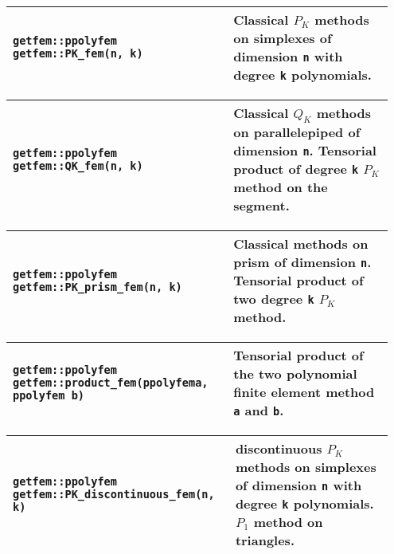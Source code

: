 \begin{center} \begin{tabular}{|m{0.55\linewidth}|m{0.4\linewidth}|} \hline
{\tt getfem::ppolyfem getfem::PK\_fem(n, k)} & Classical $P_K$ methods on simplexes of dimension  {\tt n} with degree {\tt k} polynomials.\\ \hline
\end{tabular}  
\begin{tabular}{|m{0.55\linewidth}|m{0.4\linewidth}|} \hline
{\tt getfem::ppolyfem getfem::QK\_fem(n, k)} & Classical $Q_K$ methods on parallelepiped of dimension {\tt n}. Tensorial product of degree {\tt k} $P_K$ method on the segment. \\ \hline
\end{tabular}  
\begin{tabular}{|m{0.55\linewidth}|m{0.4\linewidth}|} \hline
{\tt getfem::ppolyfem getfem::PK\_prism\_fem(n, k)} & Classical methods on prism of dimension {\tt n}. Tensorial product of two degree {\tt k} $P_K$ method. \\ \hline
\end{tabular}  
\begin{tabular}{|m{0.55\linewidth}|m{0.4\linewidth}|} \hline
{\tt getfem::ppolyfem getfem::product\_fem(ppolyfem\;a, ppolyfem b)} & Tensorial product of the two polynomial finite element method {\tt a} and {\tt b}. \\ \hline
\end{tabular}   
\begin{tabular}{|m{0.55\linewidth}|m{0.4\linewidth}|} \hline
{\tt getfem::ppolyfem getfem::PK\_discontinuous\_fem(n, k)} & discontinuous $P_K$ methods on simplexes of dimension  {\tt n} with degree {\tt k} polynomials. $P_1$ method on triangles. \\ \hline
\end{tabular}  
\end{center}
